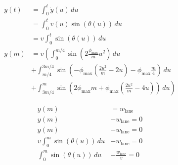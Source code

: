 \documentclass{article}
\begin{document}
\begin{align}
  y\left(t\right) &= \int_{0}^{t} \dot{y}\left(u\right)\,du\\
  &= \int_{0}^{t} v\left(u\right)\sin\left(\theta\left(u\right)\right)\,du\\
  &= v \int_{0}^{t} \sin\left(\theta\left(u\right)\right)\,du\\
  y\left(m\right) &= v \left(\int_{0}^{m/4} \sin\left(2\frac{\phi_{\max}}{m} u^2\right)\,du\right.\\
  &+ \int_{m/4}^{3m/4} \sin\left(-\phi_{\max}\left(\frac{2u^{2}}{m}-2u\right) - \phi_{\max}\frac{m}{4}\right)\,du\\
  &+ \left.\int_{3m/4}^{m} \sin\left(2\phi_{\max}m + \phi_{\max}\left(\frac{2u^{2}}{m}-4u\right)\right)\,du\right)
\end{align}

\begin{align}
  y\left(m\right) &= w_{\mathrm{lane}}\\
  y\left(m\right) &- w_{\mathrm{lane}} = 0\\
  y\left(m\right) &- w_{\mathrm{lane}} = 0\\
  v \int_{0}^{m} \sin\left(\theta\left(u\right)\right)\,du &- w_{\mathrm{lane}} = 0\\
  \int_{0}^{m} \sin\left(\theta\left(u\right)\right)\,du &- \frac{w_{\mathrm{lane}}}{v} = 0
\end{align}
\end{document}

